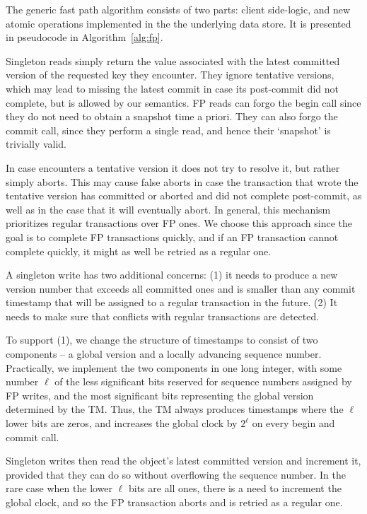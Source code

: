 The generic fast  path algorithm consists of two parts: 
client side-logic, and new atomic operations implemented in the the underlying data store.
It is presented in pseudocode in Algorithm~\ref{alg:fp}. 

Singleton reads simply return the value associated with the  latest committed version of the requested key they encounter.  
They ignore tentative versions, which may lead to missing the latest commit in case its post-commit did not complete, 
but is allowed by our semantics. 
FP reads can forgo the begin call since they do not need to obtain a snapshot time a priori. 
They can also forgo the commit call, since they perform a single read, and hence their `snapshot' is trivially valid.

In case   encounters a tentative version it does not try to resolve it, but rather simply aborts.
This may cause false aborts in case the transaction that wrote the tentative version has committed or aborted and did not 
complete post-commit, as well as in the case that it will eventually abort. 
In general, this mechanism prioritizes regular transactions over FP ones. We choose this approach since
the goal is to complete FP transactions quickly, and if an FP transaction cannot complete quickly, it might as well be 
retried as a regular one.
   
A singleton write has two additional concerns: (1) it needs to  produce a new version number that exceeds all committed ones and
is smaller than any commit timestamp that will be assigned to a regular transaction in the future.
(2)  It needs to make sure that conflicts with regular transactions are detected. 

To support (1), we change the structure of timestamps to consist of two 
components -- a global version and a locally advancing sequence number.
Practically, we implement the two components in one long integer, with some number $\ell$ of the less significant bits
reserved for sequence numbers assigned by FP writes, and the most significant bits representing 
the global version determined by the TM. Thus, the TM always produces timestamps where the $\ell$ lower bits are zeros,
and increases the global clock by $2^\ell$ on every begin and commit call.  

Singleton writes then read the object's latest committed version and increment it, provided that they can do so 
 without overflowing the sequence number. 
In the rare case when the lower $\ell$ bits are all ones, there is a need to increment the global clock, and so the FP transaction aborts and is retried
as a regular one. 

